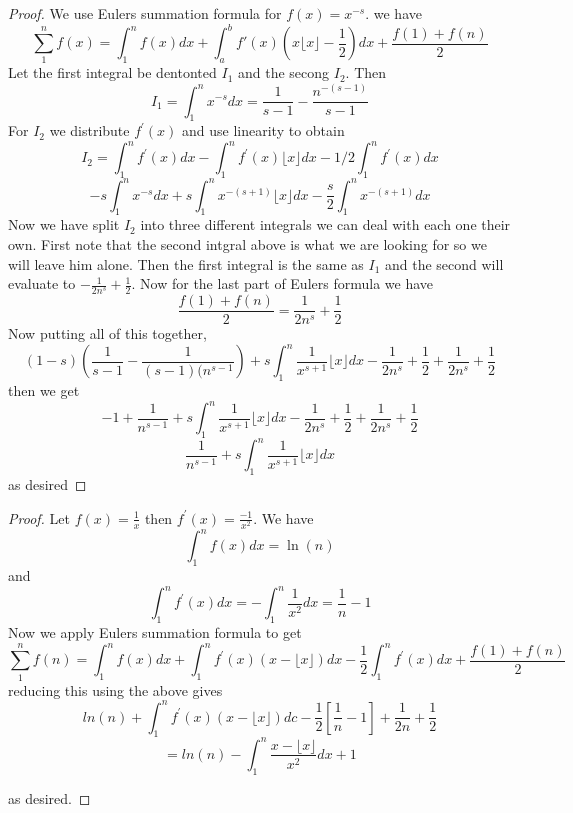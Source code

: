 \documentclass[11pt,largemargins]{homework}
\begin{document}
\question 
\begin{alphaparts} 
	\questionpart 
\begin{proof} 
	We use Eulers summation formula for $f(x) = x^{-s}$. 
	we have 
\[ \sum_1^n f(x) = \int_1^n f(x) dx + \int_a^b f'(x)(x \lfloor x \rfloor - \frac{1}{2}) dx + \frac{f(1) + f(n)}{2} \] 
Let the first integral be dentonted $I_1$ and the secong $I_2$. Then 
\[ I_1 = \int_1^n x^{-s}dx = \frac{1}{s - 1} - \frac{n^{-(s-1)}}{s-1} \] 
For $I_2$ we distribute $f^\prime(x)$ and use linearity to obtain 
\[I_2 = \int_1^n f^\prime(x) dx - \int_1^n f^\prime(x) \lfloor x \rfloor dx - 1/2 \int_1^n f^\prime(x) dx \] 
\[ -s \int_1^n x^{-s} dx + s\int_1^n x^{-(s+1)} \lfloor x \rfloor dx - \frac{s}{2}\int_1^n x^{-(s+1)} dx \] 
Now we have split $I_2$ into three different integrals we can deal with each one their own. First 
note that the second intgral above is what we are looking for so we will leave him alone. 
Then the first integral is the same as $I_1$ and the second will evaluate to $-\frac{1}{2n^s} + \frac{1}{2}$. 
Now for the last part of Eulers formula we have  
\[\frac{f(1) + f(n)}{2} =  \frac{1}{2n^s} + \frac{1}{2} \]  
Now putting all of this together, 
\[(1 -s) \left(\frac{1}{s-1} - \frac{1}{(s-1)(n^{s-1}} \right) + s\int_1^n \frac{1}{x^{s+1}} \lfloor x \rfloor dx - \frac{1}{2n^s} + \frac{1}{2}+ \frac{1}{2n^s} + \frac{1}{2} \] 
then we get 
\[ -1 + \frac{1}{n^{s-1}} +  s\int_1^n \frac{1}{x^{s+1}} \lfloor x \rfloor dx  - \frac{1}{2n^s} + \frac{1}{2}+ \frac{1}{2n^s} + \frac{1}{2} \] 
\[ \frac{1}{n^{s-1}} +  s\int_1^n \frac{1}{x^{s+1}} \lfloor x \rfloor dx \]
as desired 
\end{proof}

\questionpart 
\begin{proof} 
	Let $f(x) = \frac{1}{x}$ then $f^\prime(x) = \frac{-1}{x^2}$. We have 
	\[ \int_1^n f(x)dx = \ln(n) \] 
	and 
	\[ \int_1^n f^\prime(x) dx = - \int_1^n \frac{1}{x^2} dx = \frac{1}{n} - 1 \] 
	Now we apply Eulers summation formula to get 
	\[ \sum_1^n f(n) = \int_1^n f(x) dx + \int_1^n f^\prime(x)(x - \lfloor x \rfloor) dx - \frac{1}{2} \int_1^nf^\prime(x) dx + \frac{f(1)+ f(n)}{2}\] 
	reducing this using the above gives 
	\[ln(n) + \int_1^n f^\prime(x) (x - \lfloor x \rfloor) dc - \frac{1}{2}[\frac{1}{n} - 1] + \frac{1}{2n} + \frac{1}{2}  \] 
	\[ = ln(n) - \int_1^n \frac{x - \lfloor x \rfloor}{x^2}dx + 1 \] 

	as desired. 
\end{proof}


\end{alphaparts}
 
\end{document}
